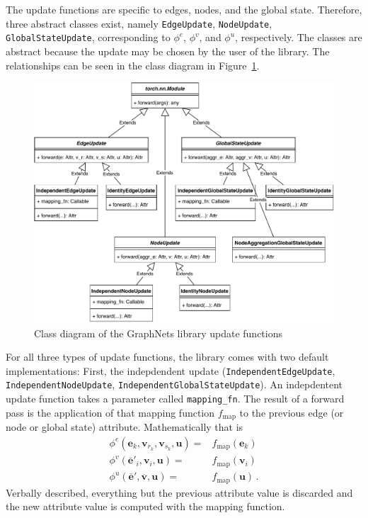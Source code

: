 The update functions are specific to edges, nodes, and the global state. Therefore, three abstract classes exist, namely \texttt{EdgeUpdate}, \texttt{NodeUpdate}, \texttt{GlobalStateUpdate}, corresponding to $\phi^e$, $\phi^v$, and $\phi^u$, respectively. The classes are abstract because the update may be chosen by the user of the library. The relationships can be seen in the class diagram in Figure~\ref{fig:classdiagramgnfunctionsupdate}.

\begin{figure}\centering
    \includegraphics[scale=0.65]{resources/graphnets-functions-update}
    \caption{Class diagram of the GraphNets library update functions}\label{fig:classdiagramgnfunctionsupdate}
\end{figure}

For all three types of update functions, the library comes with two default implementations: First, the indepdendent update (\texttt{IndependentEdgeUpdate}, \texttt{IndependentNodeUpdate}, \texttt{IndependentGlobalStateUpdate}). An indepdentent update function takes a parameter called \texttt{mapping\_fn}. The result of a forward pass is the application of that mapping function $f_\text{map}$ to the previous edge (or node or global state) attribute. Mathematically that is \begin{align}
\phi^e\left(\bm{e}_k,\bm{v}_{r_k},\bm{v}_{s_k},\bm{u}\right)=&f_\text{map}\left(\bm{e}_k\right)\\
\phi^v\left(\bm{\overline{e}}'_i,\bm{v}_i,\bm{u}\right)=&f_\text{map}\left(\bm{v}_i\right)\\
\phi^u\left(\bm{\overline{e}}',\bm{\overline{v}},\bm{u}\right)=&f_\text{map}\left(\bm{u}\right)\,.
\end{align}Verbally described, everything but the previous attribute value is discarded and the new attribute value is computed with the mapping function.

